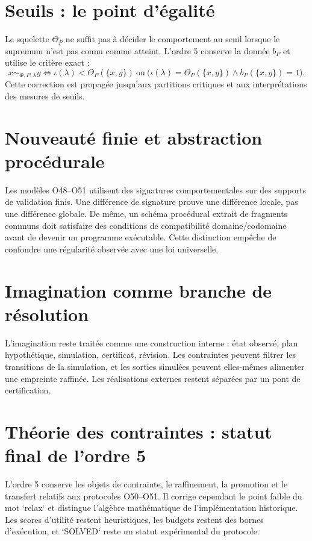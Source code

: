 \documentclass[11pt,a4paper,openany]{book}
\begin{document}
\section{Seuils : le point d'égalité}
Le squelette $\Theta_P$ ne suffit pas à décider le comportement au seuil lorsque le supremum n'est pas connu comme atteint. L'ordre 5 conserve la donnée $b_P$ et utilise le critère exact :
\[
x\sim_{\Phi,P,\lambda}y\iff \iota(\lambda)<\Theta_P(\{x,y\})\ \text{ou}\ \bigl(\iota(\lambda)=\Theta_P(\{x,y\})\land b_P(\{x,y\})=1\bigr).
\]
Cette correction est propagée jusqu'aux partitions critiques et aux interprétations des mesures de seuils.

\section{Nouveauté finie et abstraction procédurale}
Les modèles O48--O51 utilisent des signatures comportementales sur des supports de validation finis. Une différence de signature prouve une différence locale, pas une différence globale. De même, un schéma procédural extrait de fragments communs doit satisfaire des conditions de compatibilité domaine/codomaine avant de devenir un programme exécutable. Cette distinction empêche de confondre une régularité observée avec une loi universelle.

\section{Imagination comme branche de résolution}
L'imagination reste traitée comme une construction interne : état observé, plan hypothétique, simulation, certificat, révision. Les contraintes peuvent filtrer les transitions de la simulation, et les sorties simulées peuvent elles-mêmes alimenter une empreinte raffinée. Les réalisations externes restent séparées par un pont de certification.

\section{Théorie des contraintes : statut final de l'ordre 5}
L'ordre 5 conserve les objets de contrainte, le raffinement, la promotion et le transfert relatifs aux protocoles O50--O51. Il corrige cependant le point faible du mot `relax` et distingue l'algèbre mathématique de l'implémentation historique. Les scores d'utilité restent heuristiques, les budgets restent des bornes d'exécution, et `SOLVED` reste un statut expérimental du protocole.
\end{document}
